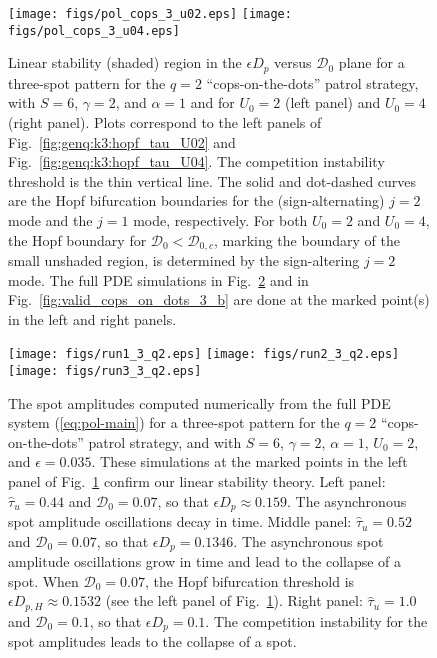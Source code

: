\documentclass{article}%
\begin{document}
\vfill\eject

\begin{figure}[htbp]
\centering
\texttt{[image: figs/pol\_cops\_3\_u02.eps]}
\texttt{[image: figs/pol\_cops\_3\_u04.eps]}
\caption{\label{fig:pol_copdots_3} Linear stability (shaded) region in
  the $\epsilon D_p$ versus ${\mathcal D}_0$ plane for a three-spot
  pattern for the $q=2$ ``cops-on-the-dots'' patrol strategy, with
  $S=6$, $\gamma=2$, and $\alpha=1$ and for $U_0=2$ (left panel) and
  $U_0=4$ (right panel). Plots correspond to the left panels of
  Fig.~\ref{fig:genq:k3:hopf_tau_U02} and
  Fig.~\ref{fig:genq:k3:hopf_tau_U04}. The competition instability
  threshold is the thin vertical line. The solid and dot-dashed curves
  are the Hopf bifurcation boundaries for the (sign-alternating) $j=2$
  mode and the $j=1$ mode, respectively. For both $U_0=2$ and $U_0=4$,
  the Hopf boundary for ${\mathcal D}_0<{\mathcal D}_{0,c}$, marking
  the boundary of the small unshaded region, is determined by the
  sign-altering $j=2$ mode.  The full PDE simulations in
  Fig.~\ref{fig:valid_cops_on_dots_3} and in 
  Fig.~\ref{fig:valid_cops_on_dots_3_b} are done at the marked point(s)
  in the left and right panels.}
\end{figure}

\begin{figure}[htbp]
\centering
\texttt{[image: figs/run1\_3\_q2.eps]}
\texttt{[image: figs/run2\_3\_q2.eps]}
\texttt{[image: figs/run3\_3\_q2.eps]}
\caption{\label{fig:valid_cops_on_dots_3} The spot amplitudes
  computed numerically from the full PDE system (\ref{eq:pol-main})
  for a three-spot pattern for the $q=2$ ``cops-on-the-dots'' patrol
  strategy, and with $S=6$, $\gamma=2$, $\alpha=1$, $U_0=2$, and
  $\epsilon=0.035$. These simulations at the marked points in the left
  panel of Fig.~\ref{fig:pol_copdots_3} confirm
  our linear stability theory.  Left panel: $\hat{\tau}_u=0.44$ and
  ${\mathcal D}_0=0.07$, so that $\epsilon D_p\approx 0.159$. The
  asynchronous spot amplitude oscillations decay in time. Middle
  panel: $\hat{\tau}_u=0.52$ and ${\mathcal D}_0=0.07$, so that
  $\epsilon D_p = 0.1346$. The asynchronous spot amplitude
  oscillations grow in time and lead to the collapse of a spot. When
  ${\mathcal D}_0=0.07$, the Hopf bifurcation threshold is
  $\epsilon D_{p,H} \approx 0.1532$ (see the left panel of
  Fig.~\ref{fig:pol_copdots_3}). Right panel: $\hat{\tau}_u=1.0$ and
  ${\mathcal D}_0=0.1$, so that $\epsilon D_p=0.1$. The
  competition instability for the spot amplitudes leads to the
  collapse of a spot.}
\end{figure}
\end{document}
